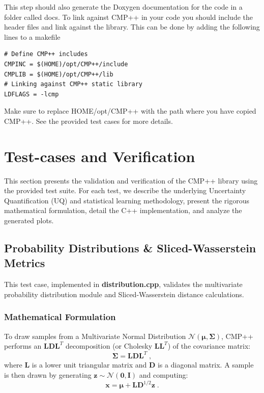\documentclass{ol-softwaremanual}
\begin{document}
\smallskip
This step should also generate the Doxygen documentation for the code in a folder called docs. To link against CMP++ in your code you should include the header files and link against the library. This can be done by adding the following lines to a makefile
\begin{listing}[H]
\begin{verbatim}
# Define CMP++ includes
CMPINC = $(HOME)/opt/CMP++/include
CMPLIB = $(HOME)/opt/CMP++/lib
# Linking against CMP++ static library
LDFLAGS = -lcmp
\end{verbatim}
\end{listing}

\smallskip
Make sure to replace HOME/opt/CMP++ with the path where you have copied CMP++. See the provided test cases for more details.

\section{Test-cases and Verification}

This section presents the validation and verification of the CMP++ library using the provided test suite. For each test, we describe the underlying Uncertainty Quantification (UQ) and statistical learning methodology, present the rigorous mathematical formulation, detail the C++ implementation, and analyze the generated plots.

\subsection{Probability Distributions \& Sliced-Wasserstein Metrics}
This test case, implemented in \textbf{distribution.cpp}, validates the multivariate probability distribution module and Sliced-Wasserstein distance calculations. 

\subsubsection{Mathematical Formulation}
To draw samples from a Multivariate Normal Distribution $\mathcal{N}(\boldsymbol{\mu}, \boldsymbol{\Sigma})$, CMP++ performs an $\mathbf{L}\mathbf{D}\mathbf{L}^T$ decomposition (or Cholesky $\mathbf{L}\mathbf{L}^T$) of the covariance matrix:
\begin{equation}
    \boldsymbol{\Sigma} = \mathbf{L} \mathbf{D} \mathbf{L}^T \;,
\end{equation}
where $\mathbf{L}$ is a lower unit triangular matrix and $\mathbf{D}$ is a diagonal matrix. A sample is then drawn by generating $\mathbf{z} \sim \mathcal{N}(\mathbf{0}, \mathbf{I})$ and computing:
\begin{equation}
    \mathbf{x} = \boldsymbol{\mu} + \mathbf{L} \mathbf{D}^{1/2} \mathbf{z} \;.
\end{equation}
\end{document}
